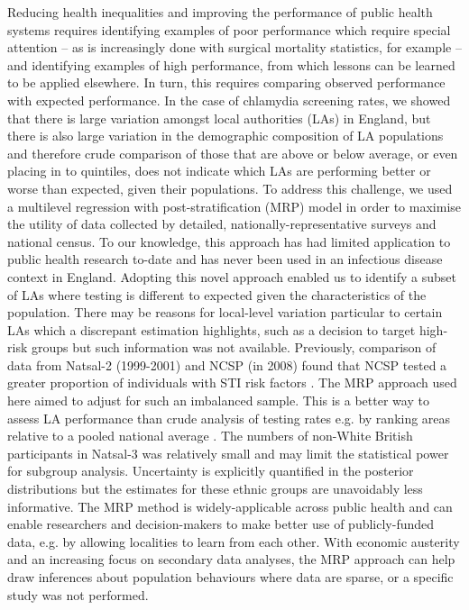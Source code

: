 \documentclass[12pt]{article}
\begin{document}
Reducing health inequalities and improving the performance of public health systems requires identifying examples of poor performance which require special attention – as is increasingly done with surgical mortality statistics, for example – and identifying examples of high performance, from which lessons can be learned to be applied elsewhere. In turn, this requires comparing observed performance with expected performance. In the case of chlamydia screening rates, we showed that there is large variation amongst local authorities (LAs) in England, but there is also large variation in the demographic composition of LA populations and therefore crude comparison of those that are above or below average, or even placing in to quintiles, does not indicate which LAs are performing better or worse than expected, given their populations. To address this challenge, we used a multilevel regression with post-stratification (MRP) model in order to maximise the utility of data collected by detailed, nationally-representative surveys and national census.  To our knowledge, this approach has had limited application to public health research to-date \cite{Zhang2013} and has never been used in an infectious disease context in England. Adopting this novel approach enabled us to identify a subset of LAs where testing is different to expected given the characteristics of the population. There may be reasons for local-level variation particular to certain LAs which a discrepant estimation highlights, such as a decision to target high-risk groups but such information was not available.
Previously, comparison of data from Natsal-2 (1999-2001) and NCSP (in 2008) found that NCSP tested a greater proportion of individuals with STI risk factors \cite{Riha2011}. The MRP approach used here aimed to adjust for such an imbalanced sample. This is a better way to assess LA performance than crude analysis of testing rates e.g. by ranking areas relative to a pooled national average \cite{Editorial2016}. 
The numbers of non-White British participants in Natsal-3 was relatively small and may limit the statistical power for subgroup analysis. Uncertainty is explicitly quantified in the posterior distributions but the estimates for these ethnic groups are unavoidably less informative.
The MRP method is widely-applicable across public health and can enable researchers and decision-makers to make better use of publicly-funded data, e.g. by allowing localities to learn from each other. With economic austerity and an increasing focus on secondary data analyses, the MRP approach can help draw inferences about population behaviours where data are sparse, or a specific study was not performed.
\end{document}

